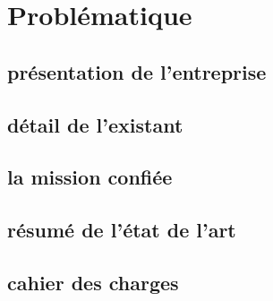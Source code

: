 \chapter{Problématique}

\section{présentation de l’entreprise}

\section{détail de l’existant}

\section{la mission confiée}

\section{résumé de l’état de l’art}

\section{cahier des charges}

